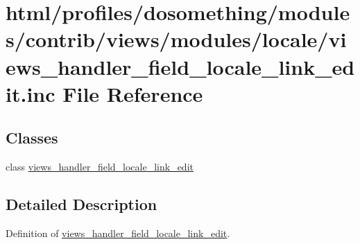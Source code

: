 \hypertarget{views__handler__field__locale__link__edit_8inc}{
\section{html/profiles/dosomething/modules/contrib/views/modules/locale/views\_\-handler\_\-field\_\-locale\_\-link\_\-edit.inc File Reference}
\label{views__handler__field__locale__link__edit_8inc}
}
\subsection*{Classes}
\begin{DoxyCompactItemize}
\item 
class \hyperlink{classviews__handler__field__locale__link__edit}{views\_\-handler\_\-field\_\-locale\_\-link\_\-edit}
\end{DoxyCompactItemize}


\subsection{Detailed Description}
Definition of \hyperlink{classviews__handler__field__locale__link__edit}{views\_\-handler\_\-field\_\-locale\_\-link\_\-edit}. 